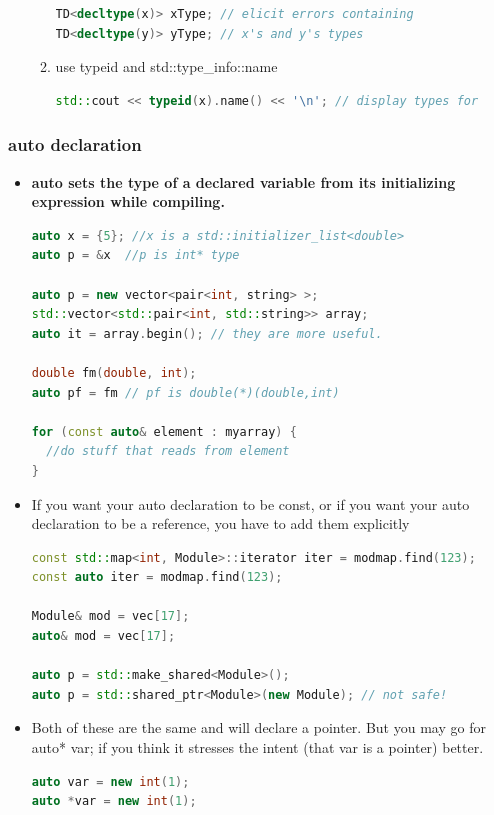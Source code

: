 \documentclass[a4paper,12pt,twoside]{book}
\begin{document}
\begin{itemize}
\begin{enumerate}
\begin{lstlisting}[frame=single, language=c++]
TD<decltype(x)> xType; // elicit errors containing
TD<decltype(y)> yType; // x's and y's types
\end{lstlisting}
\item use typeid and std::type\_info::name
\begin{lstlisting}[frame=single, language=c++]
std::cout << typeid(x).name() << '\n'; // display types for
\end{lstlisting}

\end{enumerate}

\end{itemize}

\subsubsection{auto declaration}
\begin{itemize}

\item \textbf{auto sets the type of a declared variable from its initializing expression while compiling.}

\begin{lstlisting}[frame=single, language=c++]
auto x = {5}; //x is a std::initializer_list<double>
auto p = &x  //p is int* type

auto p = new vector<pair<int, string> >;
std::vector<std::pair<int, std::string>> array;
auto it = array.begin(); // they are more useful.

double fm(double, int);
auto pf = fm // pf is double(*)(double,int)

for (const auto& element : myarray) {
  //do stuff that reads from element
}
\end{lstlisting}

\item If you want your auto declaration to be const, or if you want your auto declaration to be a reference, you have to add them explicitly

\begin{lstlisting}[frame=single, language=c++]
const std::map<int, Module>::iterator iter = modmap.find(123);
const auto iter = modmap.find(123);

Module& mod = vec[17];
auto& mod = vec[17];

auto p = std::make_shared<Module>();
auto p = std::shared_ptr<Module>(new Module); // not safe!
\end{lstlisting}

\item Both of these are the same and will declare a pointer. But you may go for auto* var; if you think it stresses the intent (that var is a pointer) better.
\begin{lstlisting}[frame=single, language=c++]
auto var = new int(1);
auto *var = new int(1);
\end{lstlisting}



\end{itemize}
\end{document}
